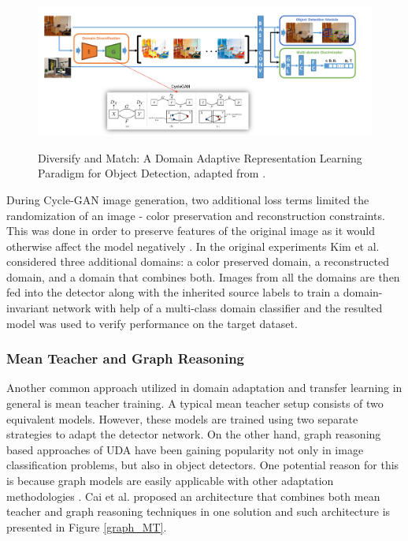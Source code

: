 \documentclass[english, 12pt, a4paper, elec, utf8, a-1b, online]{aaltothesis}
\begin{document}
\begin{figure}[htb]
	\begin{center}
		\includegraphics[width=16cm]{./diversify.png}
	\end{center}
	\caption{Diversify and Match: A Domain Adaptive Representation Learning Paradigm for Object Detection, adapted from \cite{Kim2019}.}
	\begin{center}
		\label{diversify}
	\end{center}
\end{figure}
\FloatBarrier

During Cycle-GAN image generation, two additional loss terms limited the  randomization of an image - color preservation and reconstruction constraints. This was done in order to preserve features of the original image as it would otherwise affect the model negatively \cite{Oza2021}. In the original experiments Kim et al. considered three additional domains: a color preserved domain, a reconstructed domain, and a domain that combines both. Images from all the domains are then fed into the detector along with the inherited source labels   to train a domain-invariant network with help of a multi-class domain classifier and the resulted model was used to verify performance on the target dataset. 

\subsubsection{Mean Teacher and Graph Reasoning}
\label{mean_teacher} 
Another common approach utilized in domain adaptation and transfer learning in general is mean teacher training. A typical mean teacher setup consists of two equivalent models. However, these models are trained using two separate strategies to adapt the detector network. On the other hand, graph reasoning based approaches of UDA have been gaining popularity not only in image classification problems, but also in object detectors. One potential reason for this is because graph models are easily applicable with other adaptation methodologies \cite{Oza2021}. Cai et al. \cite{Cai2019} proposed an architecture that combines both mean teacher and graph reasoning techniques in one solution and such architecture is presented in Figure \ref{graph_MT}. 
 
\end{document}
